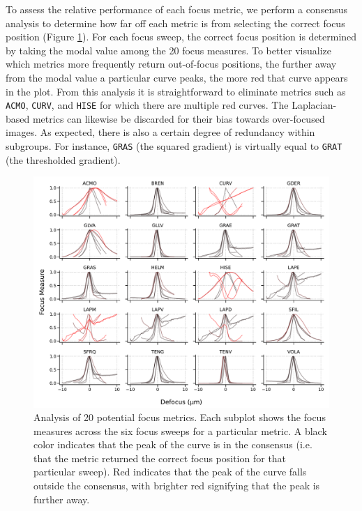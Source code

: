 To assess the relative performance of each focus metric, we perform a consensus analysis to determine how far off each metric is from selecting the correct focus position (Figure \ref{fig:A.3_metrics}). For each focus sweep, the correct focus position is determined by taking the modal value among the 20 focus measures. To better visualize which metrics more frequently return out-of-focus positions, the further away from the modal value a particular curve peaks, the more red that curve appears in the plot. From this analysis it is straightforward to eliminate metrics such as \texttt{ACMO}, \texttt{CURV}, and \texttt{HISE} for which there are multiple red curves. The Laplacian-based metrics can likewise be discarded for their bias towards over-focused images. As expected, there is also a certain degree of redundancy within subgroups. For instance, \texttt{GRAS} (the squared gradient) is virtually equal to \texttt{GRAT} (the thresholded gradient).

\begin{figure}[!tb]
    \centering
    \includegraphics[width=\linewidth]{cppendix-A/figures/figA-3_metrics.pdf}
    \caption{Analysis of 20 potential focus metrics.
    Each subplot shows the focus measures across the six focus sweeps for a particular metric.
    A black color indicates that the peak of the curve is in the consensus (i.e. that the metric returned the correct focus position for that particular sweep).
    Red indicates that the peak of the curve falls outside the consensus, with brighter red signifying that the peak is further away.}
    \label{fig:A.3_metrics}
\end{figure}

